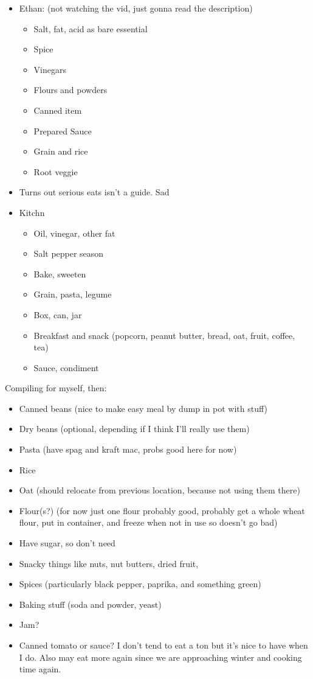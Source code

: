 \documentclass[12pt]{article}
\renewcommand{\,}{\textsuperscript{,}}
\begin{document}
\begin{itemize}
\begin{itemize}
\begin{itemize}
\item Ethan: (not watching the vid, just gonna read the description)  
\begin{itemize}  
\item Salt, fat, acid as bare essential  
\item Spice  
\item Vinegars  
\item Flours and powders  
\item Canned item  
\item Prepared Sauce  
\item Grain and rice  
\item Root veggie  
\end{itemize}  
\item Turns out serious eats isn't a guide. Sad  
\item Kitchn  
\begin{itemize}  
\item Oil, vinegar, other fat  
\item Salt pepper season  
\item Bake, sweeten  
\item Grain, pasta, legume  
\item Box, can, jar  
\item Breakfast and snack (popcorn, peanut butter, bread, oat, fruit, coffee, tea)  
\item Sauce, condiment  
\end{itemize}  
\end{itemize}

Compiling for myself, then:

\begin{itemize}

\item Canned beans (nice to make easy meal by dump in pot with stuff)  
\item Dry beans (optional, depending if I think I'll really use them)  
\item Pasta (have spag and kraft mac, probs good here for now)  
\item Rice  
\item Oat (should relocate from previous location, because not using them there)  
\item Flour(s?) (for now just one flour probably good, probably get a whole wheat flour, put in container, and freeze when not in use so doesn't go bad)  
\item Have sugar, so don't need  
\item Snacky things like nuts, nut butters, dried fruit,  
\item Spices (particularly black pepper, paprika, and something green)  
\item Baking stuff (soda and powder, yeast)  
\item Jam?  
\item Canned tomato or sauce? I don't tend to eat a ton but it's nice to have when I do. Also may eat more again since we are approaching winter and cooking time again.


\end{itemize}
\end{itemize}
\end{itemize}
\end{document}
